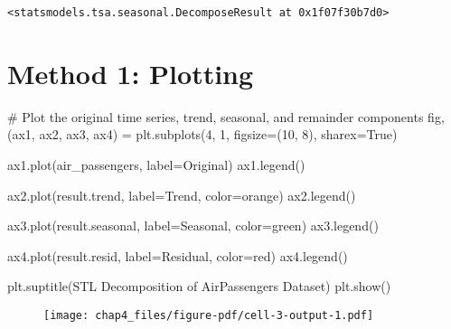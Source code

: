 \documentclass[
  letterpaper,
  DIV=11,
  numbers=noendperiod]{scrreprt}
\newenvironment{Shaded}{\begin{snugshade}}{\end{snugshade}}
\newcommand{\CommentTok}[1]{\textcolor[rgb]{0.37,0.37,0.37}{#1}}
\newcommand{\DecValTok}[1]{\textcolor[rgb]{0.68,0.00,0.00}{#1}}
\newcommand{\NormalTok}[1]{\textcolor[rgb]{0.00,0.23,0.31}{#1}}
\newcommand{\OperatorTok}[1]{\textcolor[rgb]{0.37,0.37,0.37}{#1}}
\newcommand{\StringTok}[1]{\textcolor[rgb]{0.13,0.47,0.30}{#1}}
\newcommand{\VariableTok}[1]{\textcolor[rgb]{0.07,0.07,0.07}{#1}}
\begin{document}
\begin{verbatim}
<statsmodels.tsa.seasonal.DecomposeResult at 0x1f07f30b7d0>
\end{verbatim}

\hypertarget{method-1-plotting}{%
\section{Method 1: Plotting}\label{method-1-plotting}}

\begin{Shaded}
\begin{Highlighting}[]
\CommentTok{\# Plot the original time series, trend, seasonal, and remainder components}
\NormalTok{fig, (ax1, ax2, ax3, ax4) }\OperatorTok{=}\NormalTok{ plt.subplots(}\DecValTok{4}\NormalTok{, }\DecValTok{1}\NormalTok{, figsize}\OperatorTok{=}\NormalTok{(}\DecValTok{10}\NormalTok{, }\DecValTok{8}\NormalTok{), sharex}\OperatorTok{=}\VariableTok{True}\NormalTok{)}

\NormalTok{ax1.plot(air\_passengers, label}\OperatorTok{=}\StringTok{\textquotesingle{}Original\textquotesingle{}}\NormalTok{)}
\NormalTok{ax1.legend()}

\NormalTok{ax2.plot(result.trend, label}\OperatorTok{=}\StringTok{\textquotesingle{}Trend\textquotesingle{}}\NormalTok{, color}\OperatorTok{=}\StringTok{\textquotesingle{}orange\textquotesingle{}}\NormalTok{)}
\NormalTok{ax2.legend()}

\NormalTok{ax3.plot(result.seasonal, label}\OperatorTok{=}\StringTok{\textquotesingle{}Seasonal\textquotesingle{}}\NormalTok{, color}\OperatorTok{=}\StringTok{\textquotesingle{}green\textquotesingle{}}\NormalTok{)}
\NormalTok{ax3.legend()}

\NormalTok{ax4.plot(result.resid, label}\OperatorTok{=}\StringTok{\textquotesingle{}Residual\textquotesingle{}}\NormalTok{, color}\OperatorTok{=}\StringTok{\textquotesingle{}red\textquotesingle{}}\NormalTok{)}
\NormalTok{ax4.legend()}

\NormalTok{plt.suptitle(}\StringTok{\textquotesingle{}STL Decomposition of AirPassengers Dataset\textquotesingle{}}\NormalTok{)}
\NormalTok{plt.show()}
\end{Highlighting}
\end{Shaded}

\begin{figure}[H]

{\centering \texttt{[image: chap4\_files/figure-pdf/cell-3-output-1.pdf]}

}

\end{figure}
\end{document}

